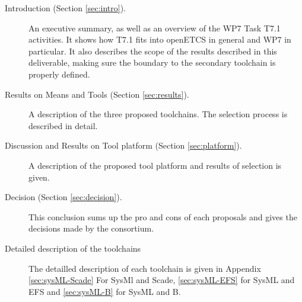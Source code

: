 \begin{description}
\item[Introduction (Section \ref{sec:intro}).] An executive summary, as well as an overview of the WP7 Task T7.1 activities.  It shows how T7.1 fits into openETCS in general and WP7 in particular.  It also describes the scope of the results described in this deliverable, making sure the boundary to the secondary toolchain is properly defined.

\item[Results on Means and Tools (Section \ref{sec:results}).] A description of the three proposed toolchains.  The selection process is described in detail.

\item[Discussion and Results on Tool platform (Section \ref{sec:platform}).] A description of the proposed tool platform and results of selection is given.

\item[Decision (Section \ref{sec:decision}).] This conclusion sums up  the pro and cons of each proposals and gives the decisions made by the consortium.

\item[Detailed description of the toolchains] The detailled description of each toolchain is given in Appendix \ref{sec:sysML-Scade} For SysMl and Scade, \ref{sec:sysML-EFS} for SysML and EFS and \ref{sec:sysML-B} for SysML and B.


\end{description}






